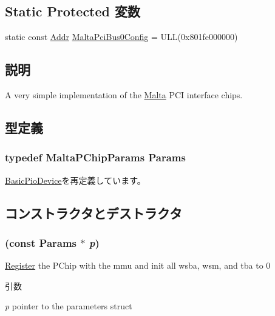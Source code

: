 \subsection*{Static Protected 変数}
\begin{DoxyCompactItemize}
\item 
static const \hyperlink{base_2types_8hh_af1bb03d6a4ee096394a6749f0a169232}{Addr} \hyperlink{classMaltaPChip_a3b0c17d07ca94915a8f0a53df21f2607}{MaltaPciBus0Config} = ULL(0x801fe000000)
\end{DoxyCompactItemize}


\subsection{説明}
A very simple implementation of the \hyperlink{classMalta}{Malta} PCI interface chips. 

\subsection{型定義}
\hypertarget{classMaltaPChip_adcfa4143cf090788abe164c8f54c1a54}{
\subsubsection[{Params}]{\setlength{\rightskip}{0pt plus 5cm}typedef MaltaPChipParams {\bf Params}}}
\label{classMaltaPChip_adcfa4143cf090788abe164c8f54c1a54}


\hyperlink{classBasicPioDevice_a2845515ac6467f10540747053c8a0449}{BasicPioDevice}を再定義しています。

\subsection{コンストラクタとデストラクタ}
\hypertarget{classMaltaPChip_aaafe219c17d10c224cc44de6ec4c7866}{
\subsubsection[{MaltaPChip}]{ (const {\bf Params} $\ast$ {\em p})}}
\label{classMaltaPChip_aaafe219c17d10c224cc44de6ec4c7866}
\hyperlink{classRegister}{Register} the PChip with the mmu and init all wsba, wsm, and tba to 0 
\begin{DoxyParams}{引数}
\item[{\em p}]pointer to the parameters struct \end{DoxyParams}



